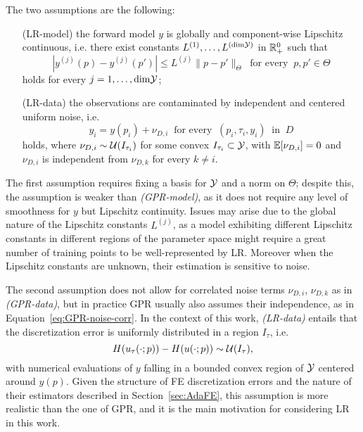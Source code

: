 The two assumptions are the following:
\begin{itemize}[font=\itshape, leftmargin=1.5cm, align=right, labelwidth=2.4cm]
    \item[(LR-model)] the forward model $y$ is globally and component-wise Lipschitz continuous, i.e. there exist constants $L^{(1)},\dots, L^{(\text{dim}\mathcal Y)}$ in $\mathbb{R}_+^0$ such that 
    \[
        |y^{(j)}(p) - y^{(j)}(p')| \leq L^{(j)} \|p - p'\|_\Theta \ \text{ for every } \ p, p' \in \Theta
    \]
    holds for every $j = 1, \dots, \text{dim}\mathcal Y$;
    \item[(LR-data)] the observations are contaminated by independent and centered uniform noise, i.e. 
    \[ 
        y_i = y(p_i) + \nu_{D,i} \ \text{ for every } \ (p_i,\tau_i,y_i) \ \text{ in } \ D
    \] 
    holds, where $\nu_{D,i} \sim \mathcal U(I_{\tau_i})$ for some convex $I_{\tau_i} \subset \mathcal Y$, with $\mathbb E[\nu_{D,i}] = 0$ and $\nu_{D,i}$ is independent from $\nu_{D,k}$ for every $k \neq i$.
\end{itemize}  
The first assumption requires fixing a basis for $\mathcal Y$ and a norm on $\Theta$; despite this, the assumption is weaker than \textit{(GPR-model)}, as it does not require any level of smoothness for $y$ but Lipschitz continuity. \newline
Issues may arise due to the global nature of the Lipschitz constants $L^{(j)}$, as a model exhibiting different Lipschitz constants in different regions of the parameter space might require a great number of training points to be well-represented by LR. 
Moreover when the Lipschitz constants are unknown, their estimation is sensitive to noise.

The second assumption does not allow for correlated noise terms $\nu_{D,i}$, $\nu_{D,k}$ as in \textit{(GPR-data)}, but in practice GPR usually also assumes their independence, as in Equation~\ref{eq:GPR-noise-corr}. 
In the context of this work, \textit{(LR-data)} entails that the discretization error is uniformly distributed in a region $I_\tau$, i.e. 
\[
    H(u_{\tau}(\cdot; p)) - H(u(\cdot; p)) \sim \mathcal U(I_\tau),
\] 
with numerical evaluations of $y$ falling in a bounded convex region of $\mathcal Y$ centered around $y(p)$. \newline
Given the structure of FE discretization errors and the nature of their estimators described in Section~\ref{sec:AdaFE}, this assumption is more realistic than the one of GPR, and it is the main motivation for considering LR in this work. \medbreak

